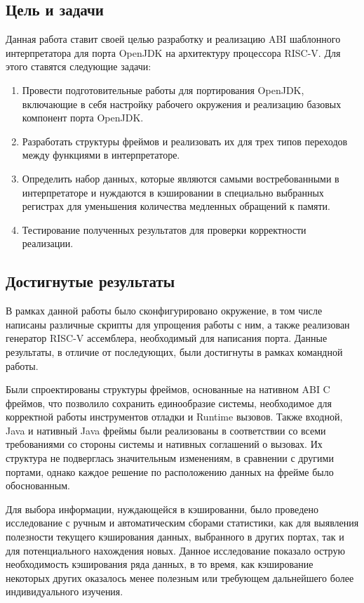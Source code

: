 \subsection*{Цель и задачи}

Данная работа ставит своей целью разработку и реализацию ABI шаблонного интерпретатора для порта OpenJDK на архитектуру процессора RISC-V. Для этого ставятся следующие задачи:

\begin{enumerate}
    \item Провести подготовительные работы для портирования OpenJDK, включающие в себя настройку рабочего окружения и реализацию базовых компонент порта OpenJDK.
    \item Разработать структуры фреймов и реализовать их для трех типов переходов между функциями в интерпретаторе.
    \item Определить набор данных, которые являются самыми востребованными в интерпретаторе и нуждаются в кэшировании в специально выбранных регистрах для уменьшения количества медленных обращений к памяти.
    \item Тестирование полученных результатов для проверки корректности реализации.
\end{enumerate}




\subsection*{Достигнутые результаты}

В рамках данной работы было сконфигурировано окружение, в том числе написаны различные скрипты для упрощения работы с ним, а также реализован генератор RISC-V ассемблера, необходимый для написания порта. Данные результаты, в отличие от последующих, были достигнуты в рамках командной работы.

Были спроектированы структуры фреймов, основанные на нативном ABI C фреймов, что позволило сохранить единообразие системы, необходимое для корректной работы инструментов отладки и Runtime вызовов. Также входной, Java и нативный Java фреймы были реализованы в соответствии со всеми требованиями со стороны системы и нативных соглашений о вызовах. Их структура не подверглась значительным изменениям, в сравнении с другими портами, однако каждое решение по расположению данных на фрейме было обоснованным.

Для выбора информации, нуждающейся в кэшированни, было проведено исследование с ручным и автоматическим сборами статистики, как для выявления полезности текущего кэширования данных, выбранного в других портах, так и для потенциального нахождения новых. Данное исследование показало острую необходимость кэширования ряда данных, в то время, как кэширование некоторых других оказалось менее полезным или требующем дальнейшего более индивидуального изучения.

